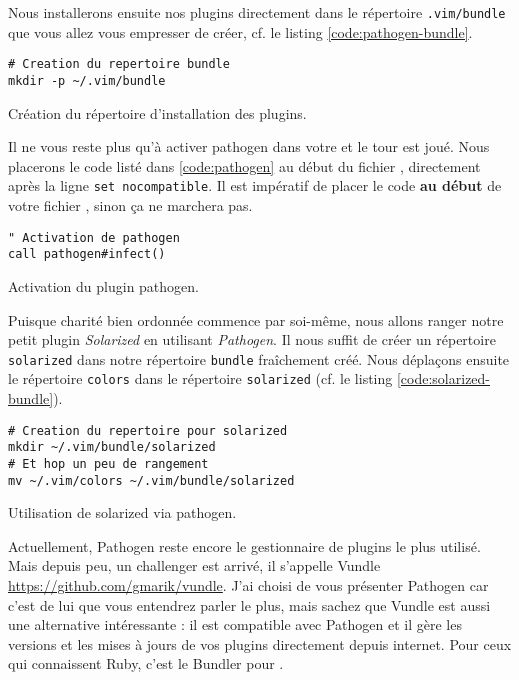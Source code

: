 Nous installerons ensuite nos plugins directement dans le répertoire \Verb|.vim/bundle| que vous allez vous empresser de créer, cf. le listing \ref{code:pathogen-bundle}.

\begin{listing}[H]
\begin{verbatim}
# Creation du repertoire bundle
mkdir -p ~/.vim/bundle
\end{verbatim}
  \caption{Création du répertoire d'installation des plugins.}
  \label{code:pathogen-bundle}
\end{listing}

Il ne vous reste plus qu'à activer pathogen dans votre \vimrc et le tour est joué. Nous placerons le code listé dans 
\ref{code:pathogen} au début du fichier \vimrc, directement après la ligne \Verb|set nocompatible|. Il est impératif de placer le code \textbf{au début} de votre fichier \vimrc, sinon ça ne marchera pas.

\begin{listing}[H]

\begin{verbatim}
" Activation de pathogen
call pathogen#infect()
\end{verbatim}
\caption{Activation du plugin pathogen.}
\label{code:pathogen}
\end{listing}

Puisque charité bien ordonnée commence par soi-même, nous allons ranger notre petit plugin \emph{Solarized} en utilisant \emph{Pathogen}. Il nous suffit de créer un répertoire \Verb|solarized| dans notre répertoire \Verb|bundle| fraîchement créé. Nous déplaçons ensuite le répertoire \Verb|colors| dans le répertoire \Verb|solarized| (cf. le listing \ref{code:solarized-bundle}).

\begin{listing}[H]
\begin{verbatim}
# Creation du repertoire pour solarized
mkdir ~/.vim/bundle/solarized
# Et hop un peu de rangement
mv ~/.vim/colors ~/.vim/bundle/solarized
\end{verbatim}
  \caption{Utilisation de solarized via pathogen.}
  \label{code:solarized-bundle}
\end{listing}

Actuellement, Pathogen reste encore le gestionnaire de plugins \vim le plus utilisé. Mais depuis peu, un challenger est arrivé, il s'appelle Vundle \url{https://github.com/gmarik/vundle}. J'ai choisi de vous présenter Pathogen car c'est de lui que vous entendrez parler le plus, mais sachez que Vundle est aussi une alternative intéressante : il est compatible avec Pathogen et il gère les versions et les mises à jours de vos plugins directement depuis internet. Pour ceux qui connaissent Ruby, c'est le Bundler  pour \vim.


